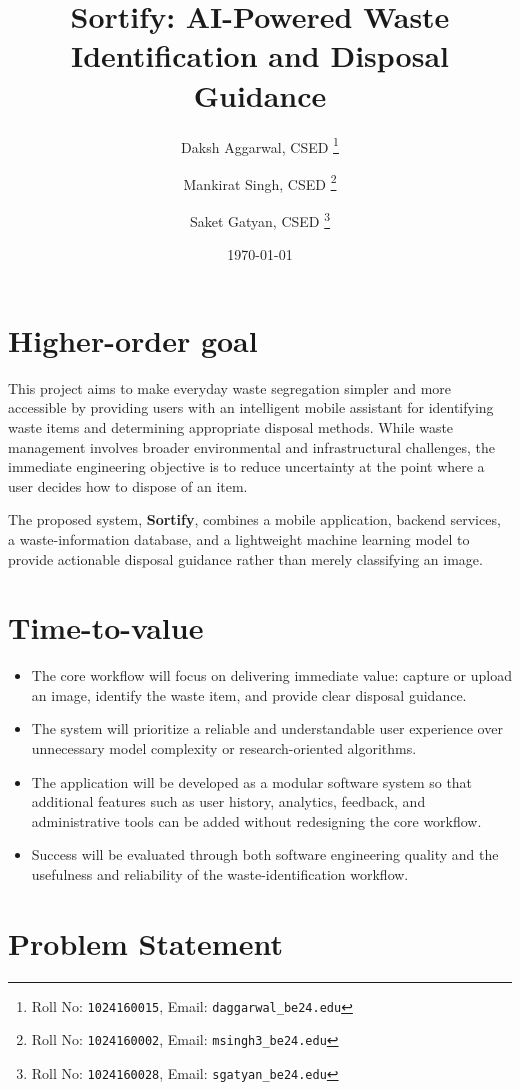 \documentclass[11pt,a4paper]{article}
\title{Sortify: AI-Powered Waste Identification and Disposal Guidance}
\author{
  Daksh Aggarwal, CSED%
  \thanks{Roll No: \texttt{1024160015}, %
    Email: \texttt{daggarwal\_be24\@thapar.edu}}
  \and
  Mankirat Singh, CSED%
  \thanks{Roll No: \texttt{1024160002}, %
    Email: \texttt{msingh3\_be24\@thapar.edu}}
  \and
  Saket Gatyan, CSED%
  \thanks{Roll No: \texttt{1024160028}, %
    Email: \texttt{sgatyan\_be24\@thapar.edu}}
}
\date{\today}
\begin{document}
\maketitle

\section{Higher-order goal}

This project aims to make everyday waste segregation simpler and more accessible by providing users with an intelligent mobile assistant for identifying waste items and determining appropriate disposal methods. While waste management involves broader environmental and infrastructural challenges, the immediate engineering objective is to reduce uncertainty at the point where a user decides how to dispose of an item.

The proposed system, \textbf{Sortify}, combines a mobile application, backend services, a waste-information database, and a lightweight machine learning model to provide actionable disposal guidance rather than merely classifying an image.

\section{Time-to-value}

\begin{itemize}[leftmargin=0.7cm]
    \item The core workflow will focus on delivering immediate value: capture or upload an image, identify the waste item, and provide clear disposal guidance.
    \item The system will prioritize a reliable and understandable user experience over unnecessary model complexity or research-oriented algorithms.
    \item The application will be developed as a modular software system so that additional features such as user history, analytics, feedback, and administrative tools can be added without redesigning the core workflow.
    \item Success will be evaluated through both software engineering quality and the usefulness and reliability of the waste-identification workflow.
\end{itemize}

\section{Problem Statement}
\end{document}
